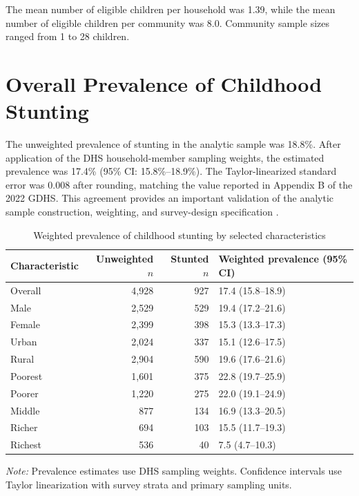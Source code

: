 The mean number of eligible children per household was 1.39, while the mean number of eligible children per community was 8.0. Community sample sizes ranged from 1 to 28 children.

\section{Overall Prevalence of Childhood Stunting}

The unweighted prevalence of stunting in the analytic sample was 18.8\%. After application of the DHS household-member sampling weights, the estimated prevalence was 17.4\% (95\% CI: 15.8\%--18.9\%). The Taylor-linearized standard error was 0.008 after rounding, matching the value reported in Appendix B of the 2022 GDHS. This agreement provides an important validation of the analytic sample construction, weighting, and survey-design specification \citep{GSSICF2024}.


\begin{table}[H]
\centering
\caption{Weighted prevalence of childhood stunting by selected characteristics}
\label{tab:descriptive_stunting}
\begin{tabular}{lrrl}
\toprule
Characteristic & Unweighted $n$ & Stunted $n$ & Weighted prevalence (95\% CI) \\
\midrule
Overall & 4,928 & 927 & 17.4 (15.8--18.9) \\
\addlinespace
Male & 2,529 & 529 & 19.4 (17.2--21.6) \\
Female & 2,399 & 398 & 15.3 (13.3--17.3) \\
\addlinespace
Urban & 2,024 & 337 & 15.1 (12.6--17.5) \\
Rural & 2,904 & 590 & 19.6 (17.6--21.6) \\
\addlinespace
Poorest & 1,601 & 375 & 22.8 (19.7--25.9) \\
Poorer & 1,220 & 275 & 22.0 (19.1--24.9) \\
Middle & 877 & 134 & 16.9 (13.3--20.5) \\
Richer & 694 & 103 & 15.5 (11.7--19.3) \\
Richest & 536 & 40 & 7.5 (4.7--10.3) \\
\bottomrule
\end{tabular}

\vspace{0.4em}
\begin{minipage}{0.93\textwidth}
\footnotesize
\textit{Note:} Prevalence estimates use DHS sampling weights. Confidence intervals use Taylor linearization with survey strata and primary sampling units.
\end{minipage}
\end{table}

